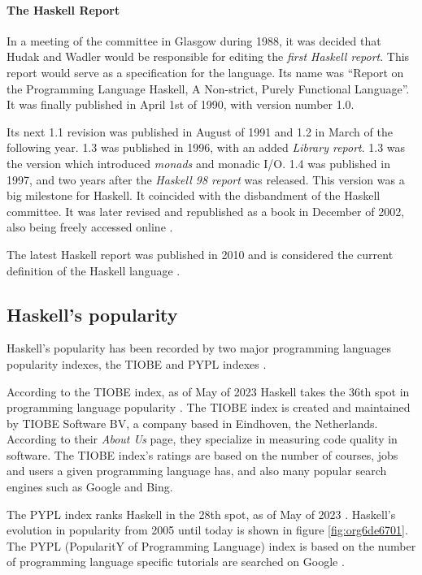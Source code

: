 \documentclass[a4paper, titlepage, twoside]{article}
\begin{document}
\paragraph*{The Haskell Report}
\label{sec:orgeaea71c}

In a meeting of the committee in Glasgow during 1988, it was decided that Hudak and Wadler would be responsible for editing the \emph{first Haskell report}. This report would serve as a specification for the language. Its name was ``Report on the Programming Language Haskell, A Non-strict, Purely Functional Language''. It was finally published in April 1st of 1990, with version number 1.0.

Its next 1.1 revision was published in August of 1991 and 1.2 in March of the following year. 1.3 was published in 1996, with an added \emph{Library report}. 1.3 was the version which introduced \emph{monads} and monadic I/O. 1.4 was published in 1997, and two years after the \emph{Haskell 98 report} was released. This version was a big milestone for Haskell. It coincided with the disbandment of the Haskell committee. It was later revised and republished as a book in December of 2002, also being freely accessed online \autocite{hudakHistoryHaskellBeing2007}.

The latest Haskell report was published in 2010 and is considered the current definition of the Haskell language \autocite{marlowHaskell2010Language2010,haskellwikiHaskellHaskellWiki2023}.

\subsection{Haskell's popularity}
\label{sec:org39e227b}

Haskell's popularity has been recorded by two major programming languages popularity indexes, the TIOBE and PYPL indexes \autocites{carbonnellePYPLPopularitYProgramming2023}[][]{tiobeTIOBEIndex2023}.

According to the TIOBE index, as of May of 2023 Haskell takes the 36th spot in programming language popularity \autocite{tiobeTIOBEIndex2023}. The TIOBE index is created and maintained by TIOBE Software BV, a company based in Eindhoven, the Netherlands. According to their \emph{About Us} page, they specialize in measuring code quality in software. The TIOBE index's ratings are based on the number of courses, jobs and users a given programming language has, and also many popular search engines such as Google and Bing.

The PYPL index ranks Haskell in the 28th spot, as of May of 2023 \autocite{carbonnellePYPLPopularitYProgramming2023}. Haskell's evolution in popularity from 2005 until today is shown in figure \ref{fig:org6de6701}. The PYPL (PopularitY of Programming Language) index is based on the number of programming language specific tutorials are searched on Google \autocite{carbonnellePYPLPopularitYProgramming2023}.
\end{document}
